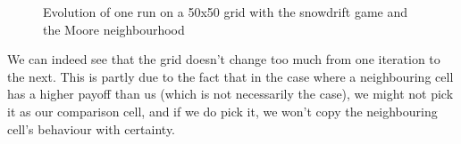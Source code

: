 \documentclass[a4paper]{article}
\begin{document}
\begin{figure}[H]
	\caption{Evolution of one run on a 50x50 grid with the snowdrift game
	and the Moore neighbourhood}
	\label{sdrun}
\end{figure}

We can indeed see that the grid doesn't change too much from one iteration to
the next. This is partly due to the fact that in the case where a neighbouring
cell has a higher payoff than us (which is not necessarily the case), we might
not pick it as our comparison cell, and if we do pick it, we won't copy the
neighbouring cell's behaviour with certainty.
\end{document}
